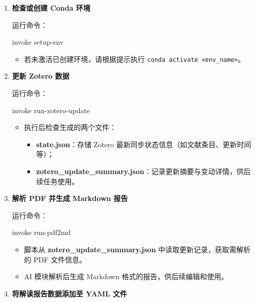 \documentclass[
  letterpaper,
  DIV=11,
  numbers=noendperiod]{scrreprt}
\newenvironment{Shaded}{\begin{snugshade}}{\end{snugshade}}
\newcommand{\ExtensionTok}[1]{\textcolor[rgb]{0.00,0.23,0.31}{#1}}
\newcommand{\NormalTok}[1]{\textcolor[rgb]{0.00,0.23,0.31}{#1}}
\providecommand{\tightlist}{%
  \setlength{\itemsep}{0pt}\setlength{\parskip}{0pt}}\usepackage{longtable,booktabs,array}
\begin{document}
\begin{enumerate}
\def\labelenumi{\arabic{enumi}.}
\item
  \textbf{检查或创建 Conda 环境}

  运行命令：

\begin{Shaded}
\begin{Highlighting}[]
\ExtensionTok{invoke}\NormalTok{ setup{-}env}
\end{Highlighting}
\end{Shaded}

  \begin{itemize}
  \tightlist
  \item
    若未激活已创建环境，请根据提示执行
    \texttt{conda\ activate\ \textless{}env\_name\textgreater{}}。
  \end{itemize}
\item
  \textbf{更新 Zotero 数据}

  运行命令：

\begin{Shaded}
\begin{Highlighting}[]
\ExtensionTok{invoke}\NormalTok{ run{-}zotero{-}update}
\end{Highlighting}
\end{Shaded}

  \begin{itemize}
  \tightlist
  \item
    执行后检查生成的两个文件：

    \begin{itemize}
    \tightlist
    \item
      \textbf{state.json}：存储 Zotero
      最新同步状态信息（如文献条目、更新时间等）；\\
    \item
      \textbf{zotero\_update\_summary.json}：记录更新摘要与变动详情，供后续任务使用。
    \end{itemize}
  \end{itemize}
\item
  \textbf{解析 PDF 并生成 Markdown 报告}

  运行命令：

\begin{Shaded}
\begin{Highlighting}[]
\ExtensionTok{invoke}\NormalTok{ run{-}pdf2md}
\end{Highlighting}
\end{Shaded}

  \begin{itemize}
  \tightlist
  \item
    脚本从 \textbf{zotero\_update\_summary.json}
    中读取更新记录，获取需解析的 PDF 文件信息。\\
  \item
    AI 模块解析后生成 Markdown 格式的报告，供后续编辑和使用。
  \end{itemize}
\item
  \textbf{将解读报告数据添加至 YAML 文件}


\end{enumerate}
\end{document}
